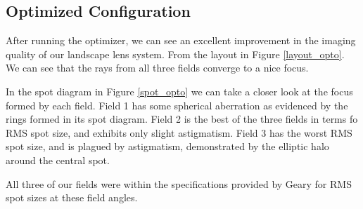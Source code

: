 \documentclass[10pt,a4paper]{article}
\begin{document}
	\pagebreak
	\subsection{Optimized Configuration}
	
		After running the optimizer, we can see an excellent improvement in the imaging quality of our landscape lens system. From the layout in Figure \ref{layout_opto}. We can see that the rays from all three fields converge to a nice focus. 
		
		In the spot diagram in Figure \ref{spot_opto} we can take a closer look at the focus formed by each field. Field 1 has some spherical aberration as evidenced by the rings formed in its spot diagram. Field 2 is the best of the three fields in terms fo RMS spot size, and exhibits only slight astigmatism. Field 3 has the worst RMS spot size, and is plagued by astigmatism, demonstrated by the elliptic halo around the central spot.
		
		All three of our fields were within the specifications provided by Geary for RMS spot sizes at these field angles.
	
\end{document}
